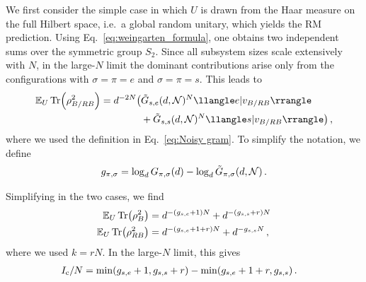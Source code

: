 \documentclass[aps,prl,twocolumn,superscriptaddress,numerical]{revtex4-2}
\newcommand{\Ic}{I_\mathrm{\rm c}} %
\newcommand{\Hol}{\chi} %
\newcommand{\Noise}{\mathcal{N}}
\newcommand{\idp}{e} %
\newcommand{\swp}{s} %
\newcommand{\Ex}{\mathbb{E}} %
\newcommand{\nreplicas}{2}
\begin{document}
We first consider the simple case in which $U$ is drawn from the Haar measure on the full Hilbert space, i.e.\ a global random unitary, which yields the RM prediction.
Using Eq.~\eqref{eq:weingarten_formula}, one obtains two independent sums over the symmetric group $S_\nreplicas$. Since all subsystem sizes scale extensively with 
$N$, in the large-$N$ limit the dominant contributions arise only from the configurations with $\sigma=\pi=\idp$ and $\sigma=\pi=\swp$. This leads to
\begin{equation}\label{eq:statistical_model_2}
\begin{split}
    \Ex_{U}\Tr(\rho_{B / RB}^\nreplicas)=d^{-\nreplicas N}\big(&\Tilde{G}_{\swp,\idp}(d,\Noise)^N \llangle e|v_{B/RB}\rrangle\\ &+\Tilde{G}_{\swp,\swp}(d,\Noise)^N \llangle s |v_{B/RB}\rrangle\big)\,,
\end{split}
\end{equation}
where we used the definition in Eq.~\eqref{eq:Noisy gram}. To simplify the notation, we define 
\begin{equation}
    g_{\pi,\sigma}=\log_d G_{\pi,\sigma}(d)-\log_d \Tilde{G}_{\pi,\sigma}(d,\Noise)\, .
\label{eq:def_g_12}
\end{equation}

Simplifying in the two cases, we find
\begin{equation}
\label{eq:RM purities}
    \begin{split}
        \Ex_{U}\Tr(\rho_B^\nreplicas)&=d^{-(g_{\swp,\idp}+1) N}+ d^{-(g_{\swp,\swp}+r)N}\\
        \Ex_{U}\Tr(\rho_{RB}^\nreplicas)&=d^{-(g_{\swp,\idp}+1+r)N}+d^{-g_{\swp,\swp} N}\,,
    \end{split}
\end{equation}
where we used $k=rN$. In the large-$N$ limit, this gives
\begin{equation}
\begin{split}
    \Ic/N &= \min( g_{\swp,\idp}+1,g_{\swp,\swp}+r)-\min(g_{\swp,\idp}+1+r,g_{\swp,\swp}) \,.
\end{split}
\label{eq:RM info}
\end{equation}
\end{document}
